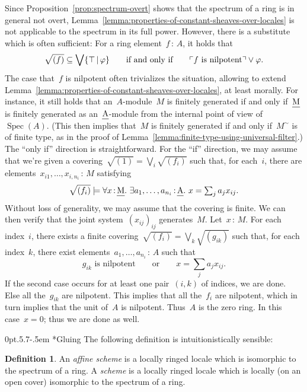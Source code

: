 \documentclass[10pt,reqno,a4paper]{amsbook}
\makeatletter
\theoremstyle{definition}
\newtheorem{defn}{Definition}[section]
\theoremstyle{plain}
\theoremstyle{remark}
\let\oldul\ul
\renewcommand{\ul}[1]{\text{\oldul{$#1$}}}
\DeclareMathOperator{\Spec}{Spec}
\newcommand{\?}{\,{:}\,}
\renewcommand{\_}{\mathpunct{.}\,}
\newcommand{\speak}[1]{\ulcorner\text{\textnormal{#1}}\urcorner}
\def\subsection{\@startsection{subsection}{2}%
  {0pt}{.5\linespacing\@plus.7\linespacing}{-.5em}%
  {\normalfont\bfseries}}
\makeatother
\begin{document}
{Since Proposition~\ref{prop:spectrum-overt} shows that the spectrum of a ring
is in general not overt,
Lemma~\ref{lemma:properties-of-constant-sheaves-over-locales} is not applicable
to the spectrum in its full power. However, there is a substitute which is often
sufficient: For a ring element~$f \? A$, it holds that
\[ \sqrt{(f)} \subseteq \bigvee \{ \top \,|\, \varphi \}
  \qquad\text{if and only if}\qquad
  \speak{$f$ is nilpotent} \vee \varphi. \]
The case that~$f$ is nilpotent often trivializes the situation, allowing to
extend Lemma~\ref{lemma:properties-of-constant-sheaves-over-locales}, at least
morally. For instance, it still holds that an~$A$-module~$M$ is finitely
generated if and only if~$\ul{M}$ is finitely
generated as an~$\ul{A}$-module from the internal point of view
of~$\Spec(A)$. (This then implies that~$M$ is finitely generated if and only
if~$M^\sim$ is of finite type, as in the proof of
Lemma~\ref{lemma:finite-type-using-universal-filter}.) The ``only if''
direction is straightforward. For the ``if'' direction, we may assume that
we're given a covering~$\sqrt{(1)} = \bigvee_i \sqrt{(f_i)}$ such that, for
each~$i$, there are elements~$x_{i1},\ldots,x_{i,n_i} \? M$ satisfying
\[ \sqrt{(f_i)} \models \forall x\?\ul{M}\_
  \exists a_1,\ldots,a_{n_i}\?\ul{A}\_
  x = \textstyle\sum_j a_j x_{ij}. \]
Without loss of generality, we may assume that the covering is finite. We can
then verify that the joint system~$(x_{ij})_{ij}$ generates~$M$. Let~$x \? M$. For
each index~$i$, there exists a finite covering~$\sqrt{(f_i)} = \bigvee_k
\sqrt{(g_{ik})}$ such that, for each index~$k$, there exist
elements~$a_1,\ldots,a_{n_i} \? A$ such that
\[ \text{$g_{ik}$ is nilpotent} \qquad\text{or}\qquad
  x = \textstyle\sum_j a_j x_{ij}. \]
If the second case occurs for at least one pair~$(i,k)$ of indices, we are
done. Else all the~$g_{ik}$ are nilpotent. This implies that all the~$f_i$ are
nilpotent, which in turn implies that the unit of~$A$ is nilpotent. Thus~$A$ is
the zero ring. In this case~$x = 0$; thus we are done as well.

\subsection*{Gluing} The following definition is intuitionistically sensible:

\begin{defn}\label{defn:scheme}
An \emph{affine scheme} is a locally ringed locale which is isomorphic to the
spectrum of a ring. A \emph{scheme} is a locally ringed locale which is locally
(on an open cover) isomorphic to the spectrum of a ring.
\end{defn}

}
\end{document}
